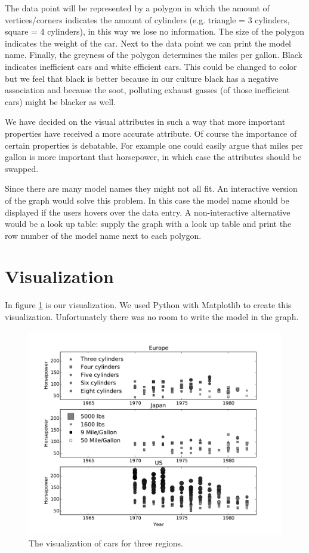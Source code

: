 \documentclass{article}[10pt]
\begin{document}
The data point will be represented by a polygon in which the amount of
vertices/corners indicates the amount of cylinders (e.g. triangle = 3 cylinders,
square = 4 cylinders), in this way we lose no information. The size of the
polygon indicates the weight of the car.
Next to the data point we can print the model name.
Finally, the greyness of the polygon determines the miles per gallon. Black
indicates inefficient cars and white efficient cars. This could be changed to
color but we feel that black is better because in our culture black has a
negative association and because the soot, polluting exhaust gasses
(of those inefficient cars) might be blacker as well.

We have decided on the visual attributes in such a way that more important
properties have received a more accurate attribute. Of course the importance of
certain properties is debatable. For example one could easily argue that
miles per gallon is more important that horsepower, in which case the attributes
should be swapped.

Since there are many model names they might not all fit. An interactive version
of the graph would solve this problem. In this case the model name should be
displayed if the users hovers over the data entry. A non-interactive
alternative would be a look up table: supply the graph with a look up table and
print the row number of the model name next to each polygon.

\section{Visualization}
In figure \ref{fig:vis} is our visualization. We used Python with Matplotlib to
create this visualization. Unfortunately there was no room to write the model
in the graph.

\begin{figure}[h!]
\includegraphics[width=\textwidth]{autovis}
\caption{The visualization of cars for three regions.}
\label{fig:vis}
\end{figure}
\end{document}
